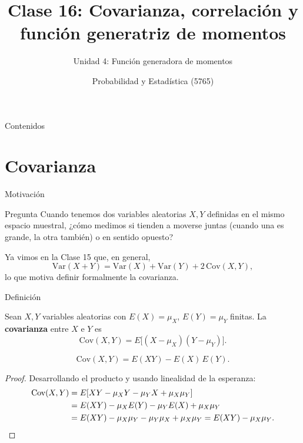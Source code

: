 \documentclass[aspectratio=169,11pt]{beamer}
\title[Prob. y Estadística]{Clase 16: Covarianza, correlación y función generatriz de momentos}
\subtitle{Unidad 4: Función generadora de momentos}
\institute[UNS]{Universidad Nacional del Sur \\ Departamento de Matemática}
\author{Probabilidad y Estadística (5765)}
\date{}
\begin{document}
\begin{frame}
\titlepage
\end{frame}

\begin{frame}{Contenidos}
\tableofcontents
\end{frame}

\section{Covarianza}

\begin{frame}{Motivación}
\begin{block}{Pregunta}
Cuando tenemos dos variables aleatorias $X, Y$ definidas en el mismo espacio muestral, ¿cómo medimos si tienden a moverse juntas (cuando una es grande, la otra también) o en sentido opuesto?
\end{block}

Ya vimos en la Clase 15 que, en general,
\[
\text{Var}(X+Y) = \text{Var}(X) + \text{Var}(Y) + 2\,\text{Cov}(X,Y),
\]
lo que motiva definir formalmente la covarianza.
\end{frame}

\begin{frame}{Definición}
\begin{definition}[Covarianza]
Sean $X,Y$ variables aleatorias con $E(X)=\mu_X$, $E(Y)=\mu_Y$ finitas. La \textbf{covarianza} entre $X$ e $Y$ es
\[
\text{Cov}(X,Y) = E\big[(X-\mu_X)(Y-\mu_Y)\big].
\]
\end{definition}

\begin{theorem}
\[
\text{Cov}(X,Y) = E(XY) - E(X)\,E(Y).
\]
\end{theorem}

\begin{proof}
Desarrollando el producto y usando linealidad de la esperanza:
\begin{align*}
\text{Cov}(X,Y) &= E[XY - \mu_X Y - \mu_Y X + \mu_X\mu_Y] \\
&= E(XY) - \mu_X E(Y) - \mu_Y E(X) + \mu_X \mu_Y \\
&= E(XY) - \mu_X\mu_Y - \mu_Y\mu_X + \mu_X\mu_Y = E(XY) - \mu_X\mu_Y. \qedhere
\end{align*}
\end{proof}
\end{frame}
\end{document}
